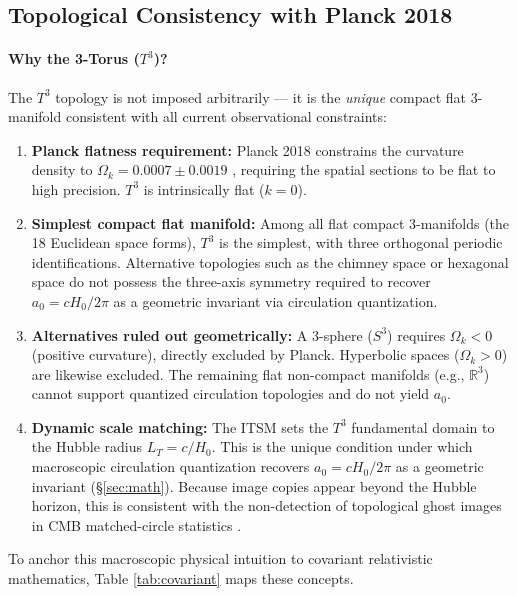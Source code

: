 \documentclass[aps,prd,10pt,twocolumn,superscriptaddress,nofootinbib,floatfix]{revtex4-2}
\begin{document}
\subsection{Topological Consistency with Planck 2018}

\paragraph{Why the 3-Torus ($T^3$)?}
The $T^3$ topology is not imposed arbitrarily --- it is the \emph{unique} compact flat 3-manifold consistent with all current observational constraints:
\begin{enumerate}
    \item \textbf{Planck flatness requirement:} Planck 2018 constrains the curvature density to $\Omega_k = 0.0007 \pm 0.0019$ \cite{planck}, requiring the spatial sections to be flat to high precision. $T^3$ is intrinsically flat ($k = 0$).
    \item \textbf{Simplest compact flat manifold:} Among all flat compact 3-manifolds (the 18 Euclidean space forms), $T^3$ is the simplest, with three orthogonal periodic identifications. Alternative topologies such as the chimney space or hexagonal space do not possess the three-axis symmetry required to recover $a_0 = cH_0/2\pi$ as a geometric invariant via circulation quantization.
    \item \textbf{Alternatives ruled out geometrically:} A 3-sphere ($S^3$) requires $\Omega_k < 0$ (positive curvature), directly excluded by Planck. Hyperbolic spaces ($\Omega_k > 0$) are likewise excluded. The remaining flat non-compact manifolds (e.g., $\mathbb{R}^3$) cannot support quantized circulation topologies and do not yield $a_0$.
    \item \textbf{Dynamic scale matching:} The ITSM sets the $T^3$ fundamental domain to the Hubble radius $L_T = c/H_0$. This is the unique condition under which macroscopic circulation quantization recovers $a_0 = cH_0/2\pi$ as a geometric invariant (\S\ref{sec:math}). Because image copies appear beyond the Hubble horizon, this is consistent with the non-detection of topological ghost images in CMB matched-circle statistics \cite{planck_topology}.
\end{enumerate}

To anchor this macroscopic physical intuition to covariant relativistic mathematics, Table \ref{tab:covariant} maps these concepts.
\end{document}
